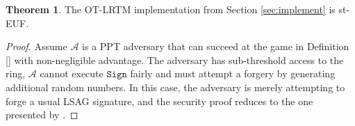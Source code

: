 \documentclass{mrl}
\theoremstyle{definition}
\newtheorem{theorem}{Theorem}[subsection]
\begin{document}
 \begin{theorem} The OT-LRTM implementation from Section \ref{sec:implement} is st-EUF.
 \end{theorem}
 \begin{proof} 
 Assume $\mathcal{A}$ is a PPT adversary that can succeed at the game in Definition \ref{} with non-negligible advantage. The adversary has sub-threshold access to the ring, $\mathcal{A}$ cannot execute $\texttt{Sign}$ fairly and must attempt a forgery by generating additional random numbers. In this case, the adversary is merely attempting to forge a usual LSAG signature, and the security proof reduces to the one presented by \cite{liu2004linkable}.
 
 
 
 
 
 \end{proof}
\end{document}
